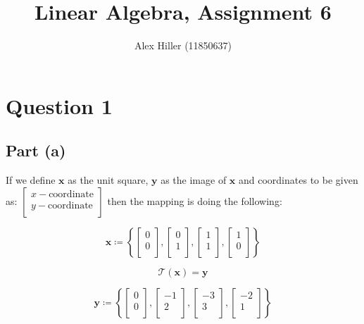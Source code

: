 \documentclass{article}
\author{Alex Hiller (11850637)}
\title{Linear Algebra, Assignment 6}
\begin{document}
\maketitle

\clearpage
\section{Question 1} 
\subsection{Part (a)} 
If we define $ \mathbf{x} $ as the unit square, $ \mathbf{y} $ as the
image of $ \mathbf{x} $ and coordinates to be given as: $ \begin{bmatrix}
    x-\text{coordinate} \\y-\text{coordinate}\\
\end{bmatrix} $ then the mapping is doing the following:

\[%
    \mathbf{x} \coloneqq \left\{ 
    \begin{bmatrix}
        0 \\ 0 \\
    \end{bmatrix}
    ,
    \begin{bmatrix}
        0\\1\\
    \end{bmatrix}
    ,
    \begin{bmatrix}
        1\\1\\
    \end{bmatrix}  
    ,
    \begin{bmatrix}
        1\\0\\
    \end{bmatrix}
    \right\}
    
\]%

\[%
    \mathcal{T} (\mathbf{x})= \mathbf{y}
\]%

\[%
    \mathbf{y} \coloneqq  \left\{ 
    \begin{bmatrix}
        0 \\ 0 \\
    \end{bmatrix}
    ,
    \begin{bmatrix}
        -1\\2\\
    \end{bmatrix}
    ,
    \begin{bmatrix}
        -3\\3\\
    \end{bmatrix}  
    ,
    \begin{bmatrix}
        -2\\1\\
    \end{bmatrix}
    \right\}
\]%
\end{document}
